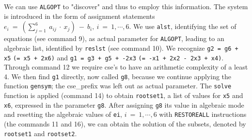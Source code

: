 We can use {\tt ALGOPT} to "discover" and thus to employ this information.
The system is introduced in the form of assignment statements
  $e_i~=~(\sum_{j=1}^{6}~a_{ij}~\cdot~x_{j})~-~b_{i},~i~=~1, \cdots ,6$.
We use {\tt alst}, identifying the set of equations (see command 9), 
as actual parameter for {\tt ALGOPT}, leading to an algebraic list, 
identified by {\tt reslst} (see command 10). We recognize {\tt g2 = g6 + x5} 
{\tt (= x5 + 2x6)} and {\tt g1 = g3 + g5 + -2x3} {\tt (= -x1 + 2x2 - 2x3 + x4)}. 
Through command 12 we require
cse's to have an arithmetic complexity of a least 4. We then find {\tt g1}
directly, now called {\tt g8}, because we continue applying the
function {\tt gensym}; the cse\_prefix was left out as actual parameter. 
The {\tt solve} function is applied (command 14) to obtain {\tt rootset1}, a list
of values for {\tt x5} and {\tt x6}, expressed in the parameter {\tt g8}.
After assigning {\tt g8} its value in algebraic mode and 
resetting the algebraic values of {\tt ei}, $i~=~ 1, \cdots ,6$ 
with {\tt RESTOREALL} instructions (the commands 11 and 16), 
we can obtain the solution 
of the subsets, denoted by {\tt rootset1} and {\tt rootset2}.
